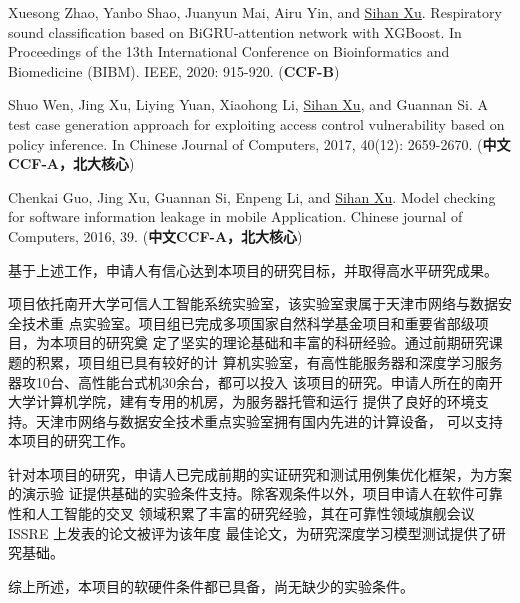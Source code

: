 \documentclass[a4paper,zihao=-4]{article}
\begin{document}
\begin{enumerate}[label={[\arabic*]}]
	\item Xuesong Zhao, Yanbo Shao, Juanyun Mai, Airu Yin, and \underline{Sihan
		      Xu}. Respiratory sound classification based on BiGRU-attention network with
	      XGBoost. In Proceedings of the 13th International Conference on
	      Bioinformatics and Biomedicine (BIBM). IEEE, 2020: 915-920. (\textbf{CCF-B})

	\item Shuo Wen, Jing Xu, Liying Yuan, Xiaohong Li, \underline{Sihan Xu}, and
	      Guannan Si. A test case generation approach for exploiting access control
	      vulnerability based on policy inference. In Chinese Journal of Computers,
	      2017, 40(12): 2659-2670. (\textbf{中文CCF-A，北大核心})

	\item Chenkai Guo, Jing Xu, Guannan Si, Enpeng Li, and \underline{Sihan Xu}. Model
	      checking for software information leakage in mobile Application.
	      Chinese journal of Computers, 2016, 39. (\textbf{中文CCF-A，北大核心})


\end{enumerate}


基于上述工作，申请人有信心达到本项目的研究目标，并取得高水平研究成果。


项目依托南开大学可信人工智能系统实验室，该实验室隶属于天津市网络与数据安全技术重
点实验室。项目组已完成多项国家自然科学基金项目和重要省部级项目，为本项目的研究奠
定了坚实的理论基础和丰富的科研经验。通过前期研究课题的积累，项目组已具有较好的计
算机实验室，有高性能服务器和深度学习服务器攻10台、高性能台式机30余台，都可以投入
该项目的研究。申请人所在的南开大学计算机学院，建有专用的机房，为服务器托管和运行
提供了良好的环境支持。天津市网络与数据安全技术重点实验室拥有国内先进的计算设备，
可以支持本项目的研究工作。

针对本项目的研究，申请人已完成前期的实证研究和测试用例集优化框架，为方案的演示验
证提供基础的实验条件支持。除客观条件以外，项目申请人在软件可靠性和人工智能的交叉
领域积累了丰富的研究经验，其在可靠性领域旗舰会议 ISSRE 上发表的论文被评为该年度
最佳论文，为研究深度学习模型测试提供了研究基础。

综上所述，本项目的软硬件条件都已具备，尚无缺少的实验条件。

\end{document}
